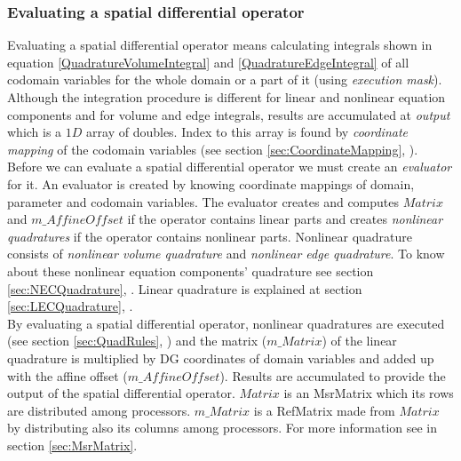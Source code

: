 \documentclass[emamy.tex]{subfiles}
\begin{document}
\subsubsection*{Evaluating a spatial differential operator}
Evaluating a spatial differential operator means calculating integrals shown in equation \ref{QuadratureVolumeIntegral} and \ref{QuadratureEdgeIntegral} of all codomain variables for the whole domain or a part of it (using \emph{execution mask}). Although the integration procedure is different for linear and nonlinear equation components and for volume and edge integrals, results are accumulated at \emph{output} which is a $1D$ array of doubles. Index to this array is found by \emph{coordinate mapping} of the codomain variables (see section \ref{sec:CoordinateMapping}, ).\\
Before we can evaluate a spatial differential operator we must create an \emph{evaluator} for it. An evaluator is created by knowing coordinate mappings of domain, parameter and codomain variables. The evaluator creates and computes $Matrix$ and $m\_AffineOffset$ if the operator contains linear parts and creates \emph{nonlinear quadratures} if the operator contains nonlinear parts. Nonlinear quadrature consists of \emph{nonlinear volume quadrature} and \emph{nonlinear edge quadrature}. To know about these nonlinear equation components' quadrature see section \ref{sec:NECQuadrature}, . Linear quadrature is explained at section \ref{sec:LECQuadrature}, .\\
By evaluating a spatial differential operator, nonlinear quadratures are executed (see section \ref{sec:QuadRules}, ) and the matrix ($m\_Matrix$) of the linear quadrature is multiplied by DG coordinates of domain variables and added up with the affine offset ($m\_AffineOffset$). Results are accumulated to provide the output of the spatial differential operator. $Matrix$ is an MsrMatrix which its rows are distributed among processors. $m\_Matrix$ is a RefMatrix made from $Matrix$ by distributing also its columns among processors. For more information see  in section \ref{sec:MsrMatrix}.\\
\end{document}
